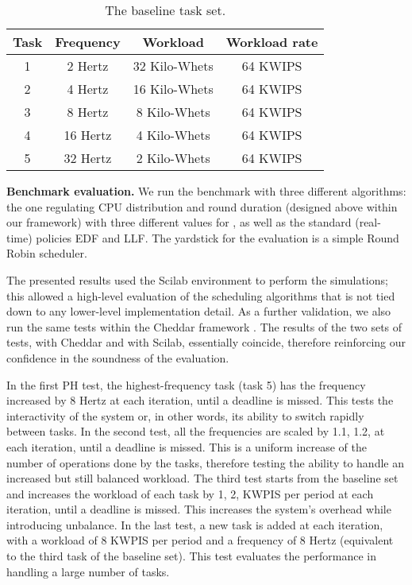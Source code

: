 \documentclass[a4paper]{article}
\begin{document}
\begin{table}[ht]
 \begin{footnotesize}
    \centering
    \begin{tabular}{|c|c|c|c|}
    \hline
    \textbf{Task} & \textbf{Frequency} & \textbf{Workload}      & \textbf{Workload rate} \\
    \hline
    \hline
    1                & 2 Hertz            & 32 Kilo-Whets          & 64 KWIPS \\
    2                & 4 Hertz            & 16 Kilo-Whets          & 64 KWIPS \\
    3                & 8 Hertz            &  8 Kilo-Whets          & 64 KWIPS \\
    4                & 16 Hertz           &  4 Kilo-Whets          & 64 KWIPS \\
    5                & 32 Hertz           &  2 Kilo-Whets          & 64 KWIPS \\
    \hline
    \end{tabular}
    \caption{The baseline task set.}
    \label{tab:baselineset}
  \end{footnotesize}
\end{table}

\textbf{Benchmark evaluation.}
We run the benchmark with three different algorithms: the one regulating CPU
distribution and round duration (designed above within our framework) with 
three different values for , as well as the standard (real-time)
policies EDF and LLF. The yardstick for the evaluation is a simple Round Robin 
scheduler.

The presented results used the Scilab environment \cite{scilab} to perform the 
simulations; this allowed a high-level evaluation of the scheduling algorithms 
that is not tied down to any lower-level implementation detail.
As a further validation, we also run the same tests within the Cheddar framework
\cite{Cheddar-2009a}.
The results of the two sets of tests, with Cheddar and with Scilab, essentially 
coincide, therefore reinforcing our confidence in the soundness of the 
evaluation.

In the first PH test, the highest-frequency task (task 5) has the
frequency increased by 8 Hertz at each iteration, until a deadline is missed.
This tests the interactivity of the system or, in other words, its ability
to switch rapidly between tasks. In the second test, all the frequencies
are scaled by 1.1, 1.2,  at each iteration, until a deadline is
missed. This is a uniform increase of the number of operations done by the
tasks, therefore testing the ability to handle an
increased but still balanced workload. The third test starts from the
baseline set and increases the workload of each task by 1, 2, 
KWPIS per period at each iteration, until a deadline is missed. This increases 
the system's overhead while introducing unbalance. In the last test, a new task 
is added at each iteration, with a workload of 8 KWPIS per period
and a frequency of 8 Hertz (equivalent to the third task of the baseline
set). This test evaluates the performance in handling a large number of
tasks.
\end{document}
